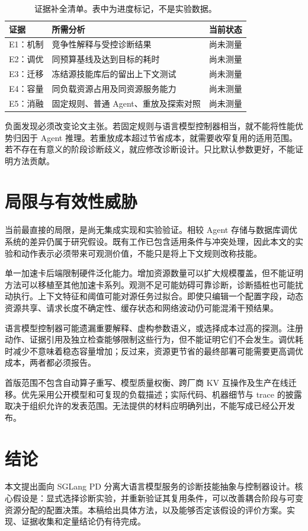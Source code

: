 \documentclass[UTF8,11pt,a4paper,fontset=windows]{ctexart}
\begin{document}
\begin{table}[h]
\centering\small
\begin{tabularx}{\linewidth}{@{}>{\raggedright\arraybackslash}p{25mm}Y>{\raggedright\arraybackslash}p{22mm}@{}}
\toprule
证据 & 所需分析 & 当前状态 \\
\midrule
E1：机制 & 竞争性解释与受控诊断结果 & 尚未测量 \\
E2：调优 & 同预算基线及达到目标的耗时 & 尚未测量 \\
E3：迁移 & 冻结源技能库后的留出上下文测试 & 尚未测量 \\
E4：容量 & 同负载资源占用及同资源服务能力 & 尚未测量 \\
E5：消融 & 固定规则、普通 Agent、重放及探索对照 & 尚未测量 \\
\bottomrule
\end{tabularx}
\caption{证据补全清单。表中为进度标记，不是实验数据。}
\end{table}

负面发现必须改变论文主张。若固定规则与语言模型控制器相当，就不能将性能优势归因于 Agent 推理。若重放成本超过节省成本，就需要收窄复用的适用范围。若不存在有意义的阶段诊断歧义，就应修改诊断设计。只比默认参数更好，不能证明方法贡献。

\section{局限与有效性威胁}
当前最直接的局限，是尚无集成实现和实验验证。相较 Agent 存储与数据库调优系统的差异仍属于研究假设。既有工作已包含适用条件与冲突处理，因此本文的实验和动作表示必须带来可观测价值，不能只是将上下文规则改称技能。

单一加速卡后端限制硬件泛化能力。增加资源数量可以扩大规模覆盖，但不能证明方法可以移植至其他加速卡系列。观测不足可能妨碍可靠诊断，诊断插桩也可能扰动执行。上下文特征和阈值可能对源任务过拟合。即使只编辑一个配置字段，动态资源共享、请求长度不确定性、缓存状态和网络波动仍可能混淆干预结果。

语言模型控制器可能遗漏重要解释、虚构参数语义，或选择成本过高的探测。注册动作、证据引用及独立检查能够限制这些行为，但不能证明它们不会发生。调优耗时减少不意味着稳态容量增加；反过来，资源更节省的最终部署可能需要更高调优成本，两者都必须报告。

首版范围不包含自动算子重写、模型质量权衡、跨厂商 KV 互操作及生产在线迁移。优先采用公开模型和可复现的负载描述；实际代码、机器细节与 trace 的披露取决于组织允许的发表范围。无法提供的材料应明确列出，不能写成已经公开发布。

\section{结论}
本文提出面向 SGLang PD 分离大语言模型服务的诊断技能抽象与控制器设计。核心假设是：显式选择诊断实验，并重新验证其复用条件，可以改善耦合阶段与可变资源分配的配置决策。本稿给出具体方法，以及能够否定该假设的评价方案。实现、证据收集和定量结论仍有待完成。
\end{document}
